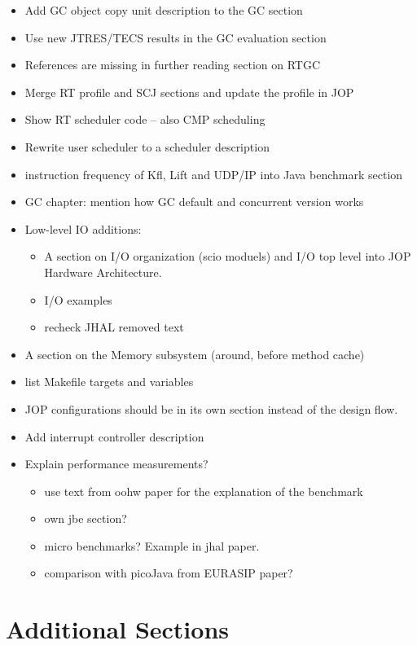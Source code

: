 \begin{itemize}
  \item Add GC object copy unit description to the GC section
  \item Use new JTRES/TECS results in the GC evaluation section
  \item References are missing in further reading section on RTGC
  \item Merge RT profile and SCJ sections and update the profile
      in JOP
  \item Show RT scheduler code -- also CMP scheduling
  \item Rewrite user scheduler to a scheduler description
    \item instruction frequency of Kfl, Lift and UDP/IP into Java
        benchmark section
    \item GC chapter: mention how GC default and concurrent
        version works
    \item Low-level IO additions:
    \begin{itemize}
      \item A section on I/O organization (scio moduels) and
          I/O top level into JOP Hardware Architecture.
      \item I/O examples
      \item recheck JHAL removed text
    \end{itemize}
    \item A section on the Memory subsystem (around, before
        method cache)
  \item list Makefile targets and variables
  \item JOP configurations should be in its own section instead
      of the design flow.
    \item Add interrupt controller description
    \item Explain performance measurements?
    \begin{itemize}
        \item use text from oohw paper for the explanation of
            the benchmark
        \item own jbe section?
        \item micro benchmarks? Example in jhal paper.
        \item comparison with picoJava from EURASIP paper?
    \end{itemize}
\end{itemize}

\section{Additional Sections}

